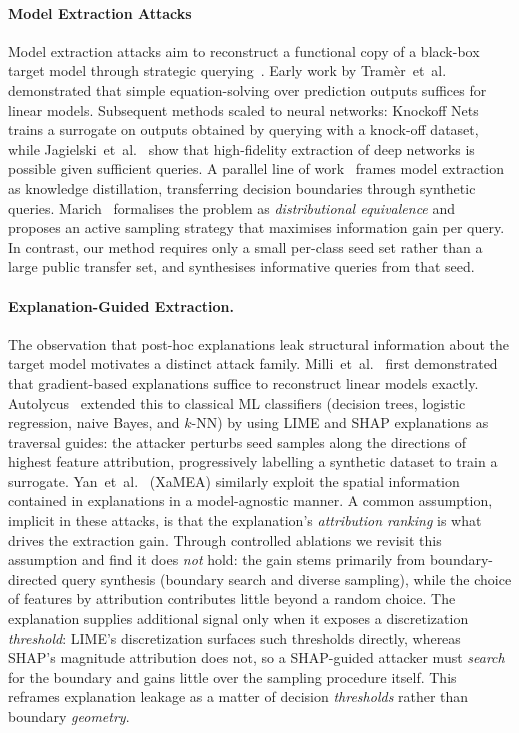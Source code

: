 \documentclass[sigconf,anonymous,review]{acmart}
\begin{document}
\paragraph{Model Extraction Attacks}
Model extraction attacks aim to reconstruct a functional copy of a black-box target model through strategic querying~\cite{tramer2016stealing}.
Early work by Tram\`er~et~al.~\cite{tramer2016stealing} demonstrated that
simple equation-solving over prediction outputs suffices for linear models.
Subsequent methods scaled to neural networks: Knockoff Nets~\cite{orekondy2019knockoff}
trains a surrogate on outputs obtained by querying with a knock-off dataset,
while Jagielski~et~al.~\cite{jagielski2020high} show that high-fidelity extraction
of deep networks is possible given sufficient queries.
A parallel line of work~\cite{papernot2017practical,correia2018copycat} frames
model extraction as knowledge distillation, transferring decision boundaries
through synthetic queries.
Marich~\cite{karmakar2023marich} formalises the problem as \emph{distributional equivalence}
and proposes an active sampling strategy that maximises information gain per query.
In contrast, our method requires only a small per-class seed set rather than a large
public transfer set, and synthesises informative queries from that seed.

\paragraph{Explanation-Guided Extraction.}
The observation that post-hoc explanations leak structural information about the
target model motivates a distinct attack family.
Milli~et~al.~\cite{milli2019model} first demonstrated that gradient-based explanations
suffice to reconstruct linear models exactly.
Autolycus~\cite{oksuz2024autolycus} extended this to classical ML classifiers
(decision trees, logistic regression, naive Bayes, and $k$-NN) by using LIME and SHAP
explanations as traversal guides: the attacker perturbs seed samples along the
directions of highest feature attribution, progressively labelling a synthetic dataset
to train a surrogate. Yan~et~al.~\cite{yan2023explanationleaks} (XaMEA) similarly
exploit the spatial information contained in explanations in a model-agnostic manner.
A common assumption, implicit in these attacks, is that the explanation's
\emph{attribution ranking} is what drives the extraction gain.
Through controlled ablations we revisit this assumption and find it does \emph{not}
hold: the gain stems primarily from boundary-directed query synthesis (boundary search and diverse sampling), while the choice of features by attribution
contributes little beyond a random choice. The explanation supplies additional signal
only when it exposes a discretization \emph{threshold}: LIME's discretization surfaces such
thresholds directly, whereas SHAP's magnitude attribution does not, so a SHAP-guided
attacker must \emph{search} for the boundary and gains little over the sampling
procedure itself. This reframes explanation leakage as a matter of decision
\emph{thresholds} rather than boundary \emph{geometry}.
\end{document}

